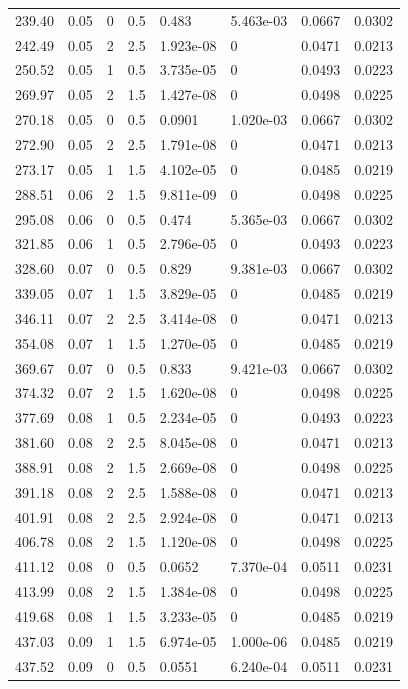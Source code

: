\documentclass[preview]{standalone}
\begin{document}
{{\begin{tabular}{L{1.2cm}C{1.2cm} C{0.3cm}C{0.5cm} C{1.4cm}C{1.4cm} C{1.4cm}C{1.4cm}}
  239.40  &  0.05  & 0     & 0.5 &  0.483  & 5.463e-03  & 0.0667 &  0.0302   \\ 
  242.49  &  0.05  & 2     & 2.5 &  1.923e-08  & 0  & 0.0471 &  0.0213   \\ 
  250.52  &  0.05  & 1     & 0.5 &  3.735e-05  & 0  & 0.0493 &  0.0223   \\ 
  269.97  &  0.05  & 2     & 1.5 &  1.427e-08  & 0  & 0.0498 &  0.0225   \\ 
  270.18  &  0.05  & 0     & 0.5 &  0.0901  & 1.020e-03  & 0.0667 &  0.0302   \\ 
  272.90  &  0.05  & 2     & 2.5 &  1.791e-08  & 0  & 0.0471 &  0.0213   \\ 
  273.17  &  0.05  & 1     & 1.5 &  4.102e-05  & 0  & 0.0485 &  0.0219   \\ 
  288.51  &  0.06  & 2     & 1.5 &  9.811e-09  & 0  & 0.0498 &  0.0225   \\ 
  295.08  &  0.06  & 0     & 0.5 &  0.474  & 5.365e-03  & 0.0667 &  0.0302   \\ 
  321.85  &  0.06  & 1     & 0.5 &  2.796e-05  & 0  & 0.0493 &  0.0223   \\ 
  328.60  &  0.07  & 0     & 0.5 &  0.829  & 9.381e-03  & 0.0667 &  0.0302   \\ 
  339.05  &  0.07  & 1     & 1.5 &  3.829e-05  & 0  & 0.0485 &  0.0219   \\ 
  346.11  &  0.07  & 2     & 2.5 &  3.414e-08  & 0  & 0.0471 &  0.0213   \\ 
  354.08  &  0.07  & 1     & 1.5 &  1.270e-05  & 0  & 0.0485 &  0.0219   \\ 
  369.67  &  0.07  & 0     & 0.5 &  0.833  & 9.421e-03  & 0.0667 &  0.0302   \\ 
  374.32  &  0.07  & 2     & 1.5 &  1.620e-08  & 0  & 0.0498 &  0.0225   \\ 
  377.69  &  0.08  & 1     & 0.5 &  2.234e-05  & 0  & 0.0493 &  0.0223   \\ 
  381.60  &  0.08  & 2     & 2.5 &  8.045e-08  & 0  & 0.0471 &  0.0213   \\ 
  388.91  &  0.08  & 2     & 1.5 &  2.669e-08  & 0  & 0.0498 &  0.0225   \\ 
  391.18  &  0.08  & 2     & 2.5 &  1.588e-08  & 0  & 0.0471 &  0.0213   \\ 
  401.91  &  0.08  & 2     & 2.5 &  2.924e-08  & 0  & 0.0471 &  0.0213   \\ 
  406.78  &  0.08  & 2     & 1.5 &  1.120e-08  & 0  & 0.0498 &  0.0225   \\ 
  411.12  &  0.08  & 0     & 0.5 &  0.0652  & 7.370e-04  & 0.0511 &  0.0231   \\ 
  413.99  &  0.08  & 2     & 1.5 &  1.384e-08  & 0  & 0.0498 &  0.0225   \\ 
  419.68  &  0.08  & 1     & 1.5 &  3.233e-05  & 0  & 0.0485 &  0.0219   \\ 
  437.03  &  0.09  & 1     & 1.5 &  6.974e-05  & 1.000e-06  & 0.0485 &  0.0219   \\ 
  437.52  &  0.09  & 0     & 0.5 &  0.0551  & 6.240e-04  & 0.0511 &  0.0231   \\ 
\hline 
\end{tabular} 

}}
\end{document}
